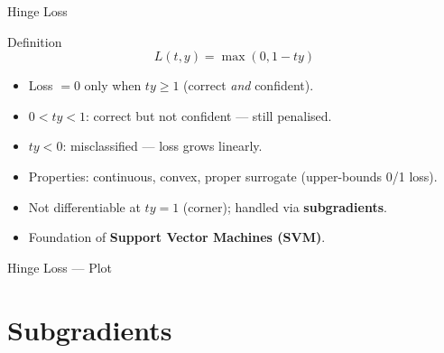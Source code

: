 \begin{frame}{Hinge Loss}
  \begin{block}{Definition}
    \[ L(t,y) = \max(0,1-ty) \]
  \end{block}
  \begin{itemize}
    \item Loss $=0$ only when $ty\geq 1$ (correct \emph{and} confident).
    \item $0<ty<1$: correct but not confident — still penalised.
    \item $ty<0$: misclassified — loss grows linearly.
    \item Properties: continuous, convex, proper surrogate (upper-bounds 0/1 loss).
    \item \textcolor{AlertRed}{Not differentiable} at $ty=1$ (corner); handled via \textbf{subgradients}.
    \item Foundation of \textbf{Support Vector Machines (SVM)}.
  \end{itemize}
\end{frame}

\begin{frame}{Hinge Loss — Plot}
  \begin{center}
  \end{center}
\end{frame}

\section{Subgradients}

